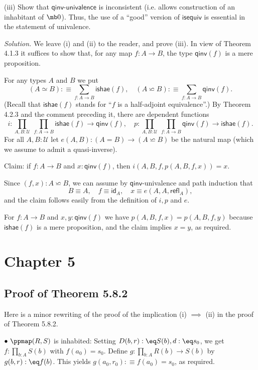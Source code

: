 \documentclass[12pt]{article}
\begin{document}
\nn(iii) Show that $\mathsf{qinv}$-$\mathsf{univalence}$ is inconsistent (i.e. allows construction of an inhabitant of $\mb0$). Thus, the use of a ``good'' version of $\mathsf{isequiv}$ is essential in the statement of univalence.

\nn\emph{Solution.} We leave (i) and (ii) to the reader, and prove (iii). In view of Theorem 4.1.3 it suffices to show that, for any map $f:A\to B$, the type $\mathsf{qinv}(f)$ is a mere proposition. 

For any types $A$ and $B$ we put 
$$
(A\simeq B):\equiv\sum_{f:A\to B}\mathsf{ishae}(f),\quad(A\backsimeq B):\equiv\sum_{f:A\to B}\mathsf{qinv}(f).
$$ 
(Recall that $\mathsf{ishae}(f)$ stands for ``$f$ is a half-adjoint equivalence''.) By Theorem 4.2.3 and the comment preceding it, there are dependent functions 
$$
i:\prod_{A,B:\mathcal U}\ \prod_{f:A\to B}\mathsf{ishae}(f)\to\mathsf{qinv}(f),\quad p:\prod_{A,B:\mathcal U}\ \prod_{f:A\to B}\mathsf{qinv}(f)\to\mathsf{ishae}(f).
$$ 
For all $A,B:\mathcal U$ let $e(A,B):(A=B)\to(A\backsimeq B)$ be the natural map (which we assume to admit a quasi-inverse).

Claim: if $f:A\to B$ and $x:\mathsf{qinv}(f)$, then $i(A,B,f,p(A,B,f,x))=x$.
 
Since $(f,x):A\backsimeq B$, we can assume by $\mathsf{qinv}$-univalence and path induction that 
$$
B\equiv A,\quad f\equiv\mathsf{id}_A,\quad x\equiv e(A,A,\mathsf{refl}_A),
$$ 
and the claim follows easily from the definition of $i,p$ and $e$.

For $f:A\to B$ and $x,y:\mathsf{qinv}(f)$ we have $p(A,B,f,x)=p(A,B,f,y)$ because $\mathsf{ishae}(f)$ is a mere proposition, and the claim implies $x=y$, as required. 


\section{Chapter 5}

\subsection{Proof of Theorem 5.8.2}\label{582}

Here is a minor rewriting of the proof of the implication (i) $\implies$ (ii) in the proof of Theorem 5.8.2. 

\nn$\bullet\ \ppmap(R,S)$ is inhabited: Setting $D(b,r):\eq S(b),d:\eq s_0$, we get $f:\prod_{b:A}S(b)$ with $f(a_0)=s_0$. Define $g:\prod_{b:A}R(b)\to S(b)$ by $g(b,r):\eq f(b)$. This yields $g(a_0,r_0):\equiv f(a_0)=s_0$, as required. 
\end{document}
